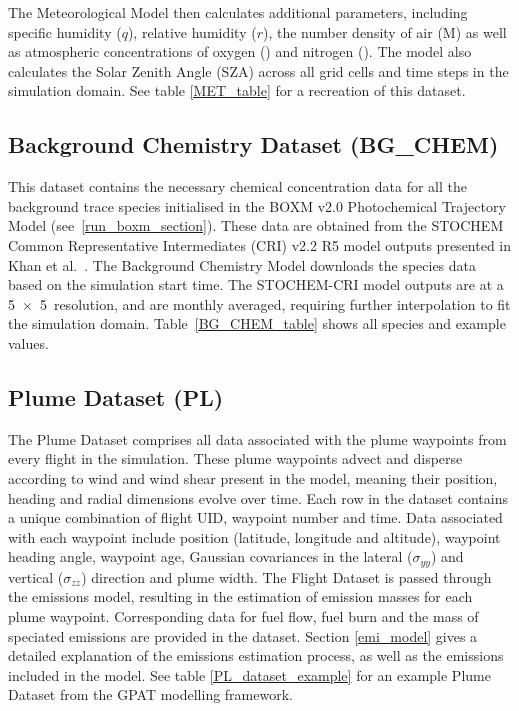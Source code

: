 The Meteorological Model then calculates additional parameters, including specific humidity ($q$), relative humidity ($r$), the number density of air (M) as well as atmospheric concentrations of oxygen () and nitrogen (). The model also calculates the Solar Zenith Angle (SZA) across all grid cells and time steps in the simulation domain. See table \ref{MET_table} for a recreation of this dataset.

\subsection{Background Chemistry Dataset (BG\_CHEM)}
This dataset contains the necessary chemical concentration data for all the background trace species initialised in the BOXM v2.0 Photochemical Trajectory Model (see~\ref{run_boxm_section}). These data are obtained from the STOCHEM Common Representative Intermediates (CRI) v2.2 R5 model outputs presented in Khan et al.~\cite{Khan2021}. The Background Chemistry Model downloads the species data based on the simulation start time. The STOCHEM-CRI model outputs are at a 5\textdegree~$\times$~5\textdegree~resolution, and are monthly averaged, requiring further interpolation to fit the simulation domain. Table~\ref{BG_CHEM_table} shows all species and example values.

\subsection{Plume Dataset (PL)}
The Plume Dataset comprises all data associated with the plume waypoints from every flight in the simulation. These plume waypoints advect and disperse according to wind and wind shear present in the model, meaning their position, heading and radial dimensions evolve over time. Each row in the dataset contains a unique combination of flight UID, waypoint number and time. Data associated with each waypoint include position (latitude, longitude and altitude), waypoint heading angle, waypoint age, Gaussian covariances in the lateral ($\sigma_{yy}$) and vertical ($\sigma_{zz}$) direction and plume width. The Flight Dataset is passed through the emissions model, resulting in the estimation of emission masses for each plume waypoint. Corresponding data for fuel flow, fuel burn and the mass of speciated emissions are provided in the dataset. Section \ref{emi_model} gives a detailed explanation of the emissions estimation process, as well as the emissions included in the model. See table \ref{PL_dataset_example} for an example Plume Dataset from the GPAT modelling framework.

